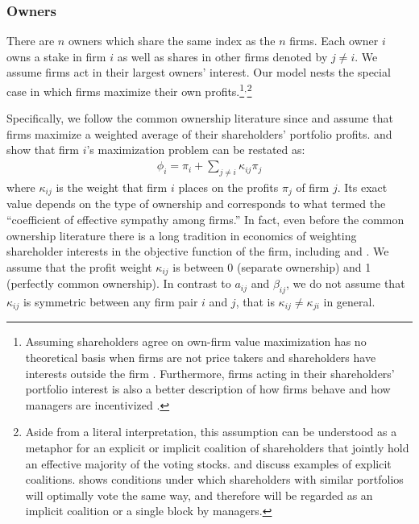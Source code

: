 \documentclass[12pt]{article}
\begin{document}
\subsubsection{Owners}

There are $n$ owners which share the same index as the $n$ firms. Each owner $i$ owns a stake in firm $i$ as well as shares in other firms denoted by $j \neq i$. We assume firms act in their largest owners' interest. Our model nests the special case in which firms maximize their own profits.\footnote{Assuming shareholders agree on own-firm value maximization has no theoretical basis when firms are not price takers and shareholders have interests outside the firm \cite{hart1979shareholder}. Furthermore, firms acting in their shareholders' portfolio interest is also a better description of how firms behave and how managers are incentivized \citep{anton2021incentives}.}$^,$\footnote{Aside from a literal interpretation, this assumption can be understood as a metaphor for an explicit or implicit coalition of shareholders that jointly hold an effective majority of the voting stocks. \cite{olson2017fracking} and \cite{shekita2020interventions} discuss examples of explicit coalitions. \cite{moskalev2020} shows conditions under which shareholders with similar portfolios will optimally vote the same way, and therefore will be regarded as an implicit coalition or a single block by managers.}

Specifically, we follow the common ownership literature since \cite{rotemberg1984financial} and assume that firms maximize a weighted average of their shareholders' portfolio profits. \cite{azar2012new} and \cite{backus2021common} show that firm $i$'s maximization problem can be restated as:
\begin{align}\label{eq:objective_function}
\phi_{i} = \pi_{i} + \sum_{j \neq i} \kappa_{ij} \pi_{j}  
\end{align}
where $\kappa_{ij}$ is the weight that firm $i$ places on the profits $\pi_j$ of firm $j$. Its exact value depends on the type of ownership and corresponds to what \citet{edgeworth1881} termed the ``coefficient of effective sympathy among firms.'' In fact, even before the common ownership literature there is a long tradition in economics of weighting shareholder interests in the objective function of the firm, including \cite{dreze1974investment} and \cite{grossman1979theory}. We assume that the profit weight $\kappa_{ij}$ is between 0 (separate ownership) and 1 (perfectly common ownership). In contrast to $a_{ij}$ and $\beta_{ij}$, we do not assume that $\kappa_{ij}$ is symmetric between any firm pair $i$ and $j$, that is $\kappa_{ij} \neq \kappa_{ji}$ in general. 
\end{document}
